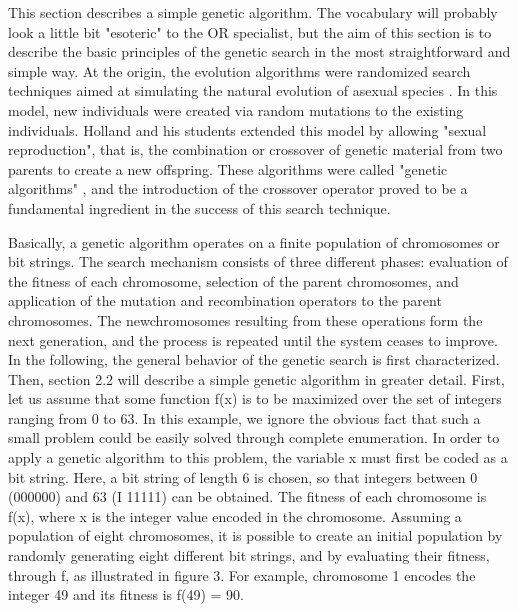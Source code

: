     \begin{algorithm}
        This section describes a simple genetic algorithm. The vocabulary will probably look a little bit "esoteric" to the OR specialist, but the aim of this section is to describe the basic principles of the genetic search in the most straightforward and simple way. 
        At the origin, the evolution algorithms were randomized search techniques aimed at simulating the natural evolution of asexual species .
        In this model, new individuals were created via random mutations to the existing individuals. Holland and his students extended this model by allowing "sexual reproduction", that is, the combination or crossover of genetic material from two parents to create a new offspring. These algorithms were called "genetic algorithms" , and the introduction of the crossover operator proved to be a fundamental ingredient in the success of this search technique. 

        Basically, a genetic algorithm operates on a finite population of chromosomes or bit strings.
        The search mechanism consists of three different phases: evaluation of the fitness of each chromosome, selection of the parent chromosomes, and application of the mutation and recombination operators to the parent chromosomes.
        The newchromosomes resulting from these operations form the next generation, and the process is repeated until the system ceases to improve. In the following, the general behavior of the genetic search is first characterized. Then, section 2.2 will describe a simple genetic algorithm in greater detail.
        First, let us assume that some function f(x) is to be maximized over the set of integers ranging from 0 to 63. In this example, we ignore the obvious fact that such a small problem could be easily solved through complete enumeration.
        In order to apply a genetic algorithm to this problem, the variable x must first be coded as a bit string.
       Here, a bit string of length 6 is chosen, so that integers between 0 (000000) and 63 (I 11111) can be obtained. The fitness of each chromosome is f(x), where x is the integer value encoded in the chromosome.
       Assuming a population of eight chromosomes, it is possible to create an initial population by randomly generating  eight different bit strings, and by evaluating their fitness, through f, as illustrated in figure 3. For example, chromosome 1 encodes the integer 49 and its fitness is f(49) = 90.

\end{algorithm}
